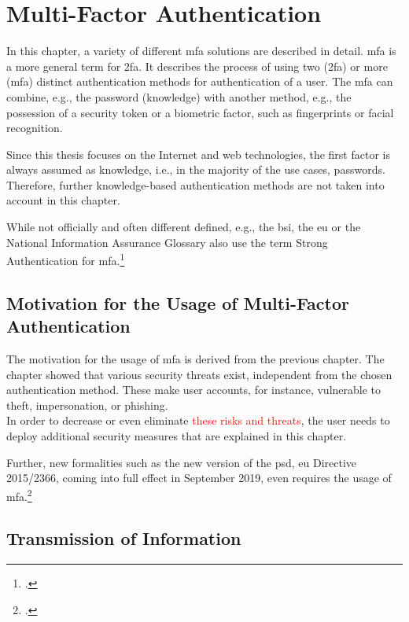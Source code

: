 \chapter{Multi-Factor Authentication}

In this chapter, a variety of different \gls{mfa} solutions are described in detail. \Gls{mfa} is a more general term for \gls{2fa}. It describes the process of using two (\gls{2fa}) or more (\gls{mfa}) distinct authentication methods for authentication of a user. The \gls{mfa} can combine, e.g., the password (knowledge) with another method, e.g., the possession of a security token or a biometric factor, such as fingerprints or facial recognition.

Since this thesis focuses on the Internet and web technologies, the first factor is always assumed as knowledge, i.e., in the majority of the use cases, passwords. Therefore, further knowledge-based authentication methods are not taken into account in this chapter.

While not officially and often different defined, e.g., the \gls{bsi}, the \gls{eu} or the National Information Assurance Glossary also use the term Strong Authentication for \gls{mfa}.\footcites[See][47]{CNSS4009}[See][11]{deutschland2018grundschutz}

\section{Motivation for the Usage of Multi-Factor Authentication}

The motivation for the usage of \gls{mfa} is derived from the previous chapter. The chapter showed that various security threats exist, independent from the chosen authentication method. These make user accounts, for instance, vulnerable to theft, impersonation, or phishing.\\
 In order to decrease or even eliminate \textcolor{red}{these risks and threats}, the user needs to deploy additional security measures that are explained in this chapter.
 
 Further, new formalities such as the new version of the \gls{psd}, \gls{eu} Directive 2015/2366, coming into full effect in September 2019, even requires the usage of \gls{mfa}.\footcites[See][10]{NOCTOR20189}

\newpage

\section{Transmission of Information}

